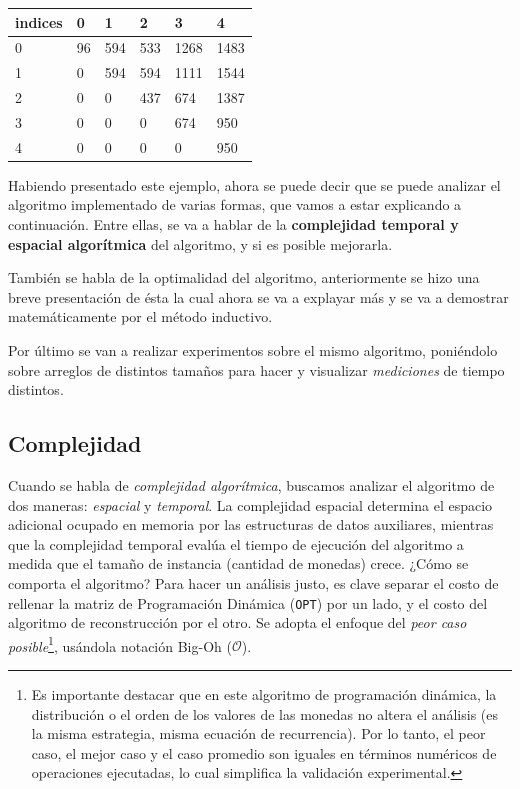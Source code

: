 \begin{table}[H]
    \centering
    \begin{tabular}{|l|l|l|l|l|l|}
    \hline
        indices & 0 & 1 & 2 & 3 & 4 \\ \hline
        0 & 96 & 594 & 533 & 1268 & 1483 \\ \hline
        1 & 0 & 594 & 594 & 1111 & 1544 \\ \hline
        2 & 0 & 0 & 437 & 674 & 1387 \\ \hline
        3 & 0 & 0 & 0 & 674 & 950 \\ \hline
        4 & 0 & 0 & 0 & 0 & 950 \\ \hline
    \end{tabular}
\end{table}

Habiendo presentado este ejemplo, ahora se puede decir que se puede analizar el algoritmo implementado de varias formas, que vamos a estar explicando a continuación. Entre ellas, se va a hablar de la \textbf{complejidad temporal y espacial algorítmica} del algoritmo, y si es posible mejorarla.

También se habla de la optimalidad del algoritmo, anteriormente se hizo una breve presentación de ésta la cual ahora se va a explayar más y se va a demostrar matemáticamente por el método inductivo.

Por último se van a realizar experimentos sobre el mismo algoritmo, poniéndolo sobre arreglos de distintos tamaños para hacer y visualizar \textit{mediciones} de tiempo distintos.


\subsection{Complejidad}
Cuando se habla de \textit{complejidad algorítmica}, buscamos analizar el algoritmo de dos maneras: \textit{espacial} y \textit{temporal}. La complejidad espacial determina el espacio adicional ocupado en memoria por las estructuras de datos auxiliares, mientras que la complejidad temporal evalúa el tiempo de ejecución del algoritmo a medida que el tamaño de instancia (cantidad de monedas) crece. ¿Cómo se comporta el algoritmo? Para hacer un análisis justo, es clave separar el costo de rellenar la matriz de Programación Dinámica (\verb|OPT|) por un lado, y el costo del algoritmo de reconstrucción por el otro.
Se adopta el enfoque del \textit{peor caso posible}\footnote{Es importante destacar que en este algoritmo de programación dinámica, la distribución o el orden de los valores de las monedas no altera el análisis (es la misma estrategia, misma ecuación de recurrencia). Por lo tanto, el peor caso, el mejor caso y el caso promedio son iguales en términos numéricos de operaciones ejecutadas, lo cual simplifica la validación experimental.}, usándola notación Big-Oh ($\mathcal{O}$).

